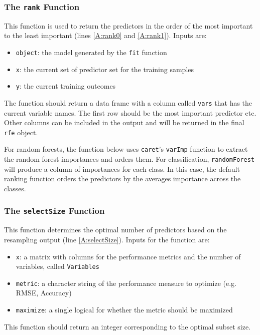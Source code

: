 \documentclass[12pt]{article}
\begin{document}
\subsubsection{The \texttt{rank} Function}

This function is used to return the predictors in the order of the most important to the least important (lines \ref{A:rank0} and \ref{A:rank1}). Inputs are:
\begin{itemize}
\item \texttt{object}: the model generated by the \texttt{fit} function
\item \texttt{x}: the current set of predictor set for the training samples
\item \texttt{y}: the current training outcomes
\end{itemize}
The function should return a data frame with a column called \texttt{vars} that has the current variable names. The first row should be the most important predictor etc. Other columns can be included in the output and will be returned in the final \texttt{rfe} object.

For random forests, the function below uses \texttt{caret}'s \texttt{varImp} function to extract the random forest importances and orders them. For classification, \texttt{randomForest} will produce a column of importances for each class. In this case, the default ranking function orders the predictors by the averages importance across the classes.
\begin{Schunk}
\end{Schunk}

\subsubsection{The \texttt{selectSize} Function}

This function determines the optimal number of predictors based on the resampling output (line \ref{A:selectSize}). Inputs for the function are:
\begin{itemize}
\item \texttt{x}: a matrix with columns for the performance metrics and the number of variables, called \texttt{Variables}
\item \texttt{metric}: a character string of the performance measure to optimize (e.g. RMSE, Accuracy)
\item \texttt{maximize}: a single logical for whether the metric should be maximized
\end{itemize}
This function should return an integer corresponding to the optimal subset size.
\end{document}
